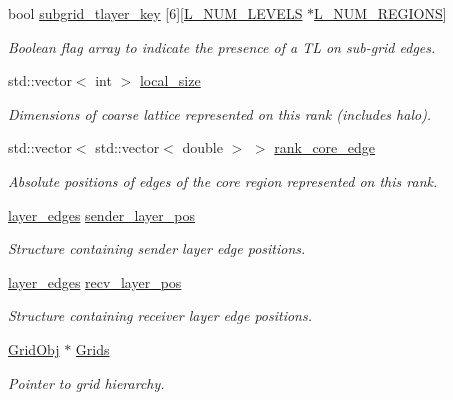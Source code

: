 \begin{DoxyCompactItemize}
bool \hyperlink{class_mpi_manager_a18d53c4f9968cccec36127d33776e3d4}{subgrid\+\_\+tlayer\+\_\+key} \mbox{[}6\mbox{]}\mbox{[}\hyperlink{definitions_8h_a2ce7c3facc5f789b0e201757516539a5}{L\+\_\+\+N\+U\+M\+\_\+\+L\+E\+V\+E\+LS} $\ast$\hyperlink{definitions_8h_a3efeae83589481193d81da498e7f746a}{L\+\_\+\+N\+U\+M\+\_\+\+R\+E\+G\+I\+O\+NS}\mbox{]}
\begin{DoxyCompactList}\small\item\em Boolean flag array to indicate the presence of a TL on sub-\/grid edges. \end{DoxyCompactList}\item 
std\+::vector$<$ int $>$ \hyperlink{class_mpi_manager_ad4a918a4cd19e644ff3295b2854fc6af}{local\+\_\+size}
\begin{DoxyCompactList}\small\item\em Dimensions of coarse lattice represented on this rank (includes halo). \end{DoxyCompactList}\item 
std\+::vector$<$ std\+::vector$<$ double $>$ $>$ \hyperlink{class_mpi_manager_a0211cd784c9ed1514d5968599e794313}{rank\+\_\+core\+\_\+edge}
\begin{DoxyCompactList}\small\item\em Absolute positions of edges of the core region represented on this rank. \end{DoxyCompactList}\item 
\hyperlink{struct_mpi_manager_1_1layer__edges}{layer\+\_\+edges} \hyperlink{class_mpi_manager_a0cb9f8f024ec0a186374995fb203ea1e}{sender\+\_\+layer\+\_\+pos}
\begin{DoxyCompactList}\small\item\em Structure containing sender layer edge positions. \end{DoxyCompactList}\item 
\hyperlink{struct_mpi_manager_1_1layer__edges}{layer\+\_\+edges} \hyperlink{class_mpi_manager_ad1ff57a97ec56efc1690dd3a5a52fd64}{recv\+\_\+layer\+\_\+pos}
\begin{DoxyCompactList}\small\item\em Structure containing receiver layer edge positions. \end{DoxyCompactList}\item 
\hyperlink{class_grid_obj}{Grid\+Obj} $\ast$ \hyperlink{class_mpi_manager_ad5ce72a2047a4cbb38f76d71c96571d8}{Grids}
\begin{DoxyCompactList}\small\item\em Pointer to grid hierarchy. \end{DoxyCompactList}\item 

\end{DoxyCompactItemize}
